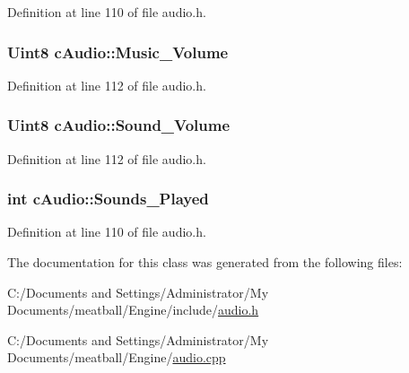Definition at line 110 of file audio.\-h.

\hypertarget{classc_audio_aa7d2c11847671823d34a694ad797bb75}{
\subsubsection[{Music\-\_\-\-Volume}]{\setlength{\rightskip}{0pt plus 5cm}Uint8 c\-Audio\-::\-Music\-\_\-\-Volume}}\label{classc_audio_aa7d2c11847671823d34a694ad797bb75}


Definition at line 112 of file audio.\-h.

\hypertarget{classc_audio_a3ac7aee05ebb4a7cdcfb5668226f6349}{
\subsubsection[{Sound\-\_\-\-Volume}]{\setlength{\rightskip}{0pt plus 5cm}Uint8 c\-Audio\-::\-Sound\-\_\-\-Volume}}\label{classc_audio_a3ac7aee05ebb4a7cdcfb5668226f6349}


Definition at line 112 of file audio.\-h.

\hypertarget{classc_audio_a9ec9fc3a055a17a90e5611570058487f}{
\subsubsection[{Sounds\-\_\-\-Played}]{\setlength{\rightskip}{0pt plus 5cm}int c\-Audio\-::\-Sounds\-\_\-\-Played}}\label{classc_audio_a9ec9fc3a055a17a90e5611570058487f}


Definition at line 110 of file audio.\-h.



The documentation for this class was generated from the following files\-:\begin{DoxyCompactItemize}
\item 
C\-:/\-Documents and Settings/\-Administrator/\-My Documents/meatball/\-Engine/include/\hyperlink{audio_8h}{audio.\-h}\item 
C\-:/\-Documents and Settings/\-Administrator/\-My Documents/meatball/\-Engine/\hyperlink{audio_8cpp}{audio.\-cpp}\end{DoxyCompactItemize}
